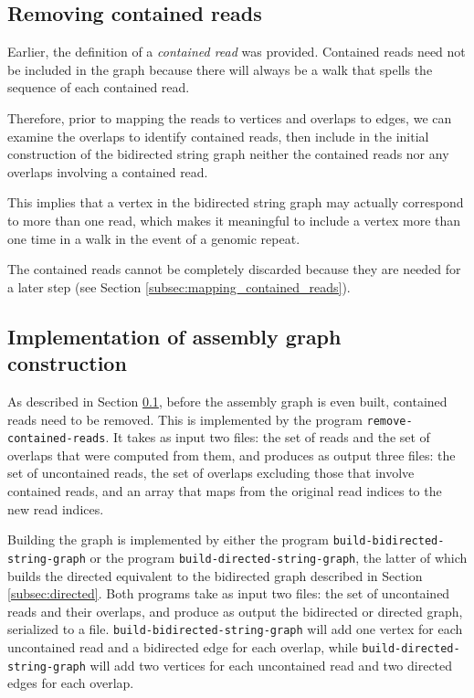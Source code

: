 \documentclass[12pt]{article}
\newcommand{\Subsection}[1]{Section \ref{#1}}
\newcommand{\KeyTerm}[1]{{\it #1}}
\newcommand{\ProgramName}[1]{{\tt #1}}
\begin{document}
\subsection{Removing contained reads}

\label{subsec:removing_contained_reads}

Earlier, the definition of a \KeyTerm{contained read} was provided.  Contained
reads need not be included in the graph because there will always be a walk that
spells the sequence of each contained read.

Therefore, prior to mapping the reads to vertices and overlaps to edges, we can
examine the overlaps to identify contained reads, then include in the initial
construction of the bidirected string graph neither the contained reads nor any
overlaps involving a contained read.

This implies that a vertex in the bidirected string graph may actually
correspond to more than one read, which makes it meaningful to include a vertex
more than one time in a walk in the event of a genomic repeat.

The contained reads cannot be completely discarded because they are needed for a
later step (see \Subsection{subsec:mapping_contained_reads}).

\subsection{Implementation of assembly graph construction}

As described in \Subsection{subsec:removing_contained_reads}, before the
assembly graph is even built, contained reads need to be removed.  This is
implemented by the program \ProgramName{remove-contained-reads}.  It takes as
input two files: the set of reads and the set of overlaps that were computed
from them, and produces as output three files: the set of uncontained reads, the
set of overlaps excluding those that involve contained reads, and an array that
maps from the original read indices to the new read indices.

Building the graph is implemented by either the program
\ProgramName{build-bidirected-string-graph} or the program
\ProgramName{build-directed-string-graph}, the latter of which builds the
directed equivalent to the bidirected graph described in
\Subsection{subsec:directed}.  Both programs take as input two files: the set of
uncontained reads and their overlaps, and produce as output the bidirected or
directed graph, serialized to a file.
\ProgramName{build-bidirected-string-graph} will add one vertex for each
uncontained read and a bidirected edge for each overlap, while
\ProgramName{build-directed-string-graph} will add two vertices for each
uncontained read and two directed edges for each overlap.
\end{document}
